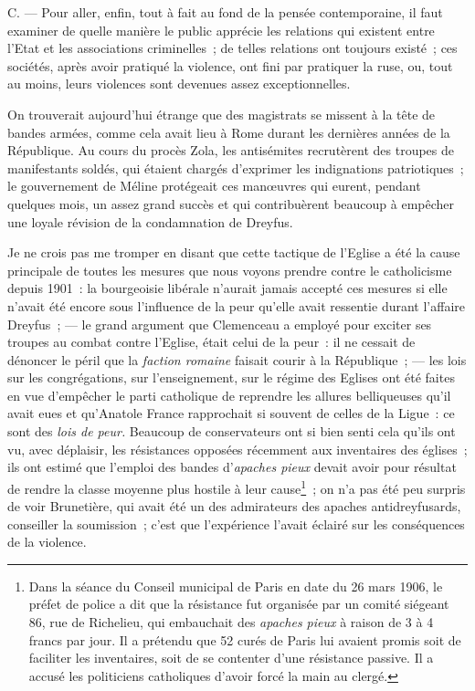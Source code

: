 \documentclass[french,twoside]{book} %
\begin{document}
\noindent C. — Pour aller, enfin, tout à fait au fond de la pensée contemporaine, il faut examiner de quelle manière le public apprécie les relations qui existent entre l’Etat et les associations criminelles ; de telles relations ont toujours existé ; ces sociétés, après avoir pratiqué la violence, ont fini par pratiquer la ruse, ou, tout au moins, leurs violences sont devenues assez exceptionnelles.\par
On trouverait aujourd’hui étrange que des magistrats se missent à la tête de bandes armées, comme cela avait lieu à Rome durant les dernières années de la République. Au cours du procès Zola, les antisémites recrutèrent des troupes de manifestants soldés, qui étaient chargés d’exprimer les indignations patriotiques ; le gouvernement de Méline protégeait ces manœuvres qui eurent, pendant quelques mois, un assez grand succès et qui contribuèrent beaucoup à empêcher une loyale révision de la condamnation de Dreyfus.\par
 Je ne crois pas me tromper en disant que cette tactique de l’Eglise a été la cause principale de toutes les mesures que nous voyons prendre contre le catholicisme depuis 1901 : la bourgeoisie libérale n’aurait jamais accepté ces mesures si elle n’avait été encore sous l’influence de la peur qu’elle avait ressentie durant l’affaire Dreyfus ; — le grand argument que Clemenceau a employé pour exciter ses troupes au combat contre l’Eglise, était celui de la peur : il ne cessait de dénoncer le péril que la \emph{faction romaine} faisait courir à la République ; — les lois sur les congrégations, sur l’enseignement, sur le régime des Eglises ont été faites en vue d’empêcher le parti catholique de reprendre les allures belliqueuses qu’il avait eues et qu’Anatole France rapprochait si souvent de celles de la Ligue : ce sont des \emph{lois de peur.} Beaucoup de conservateurs ont si bien senti cela qu’ils ont vu, avec déplaisir, les résistances opposées récemment aux inventaires des églises ; ils ont estimé que l’emploi des bandes d’\emph{apaches pieux} devait avoir pour résultat de rendre la classe moyenne plus hostile à leur cause\footnote{ \noindent Dans la séance du Conseil municipal de Paris en date du 26 mars 1906, le préfet de police a dit que la résistance fut organisée par un comité siégeant 86, rue de Richelieu, qui embauchait des \emph{apaches pieux} à raison de 3 à 4 francs par jour. Il a prétendu que 52 curés de Paris lui avaient promis soit de faciliter les inventaires, soit de se contenter d’une résistance passive. Il a accusé les politiciens catholiques d’avoir forcé la main au clergé.
 } ; on n’a pas été peu surpris de voir Brunetière, qui avait été un des admirateurs des apaches antidreyfusards, conseiller la soumission ;  c’est que l’expérience l’avait éclairé sur les conséquences de la violence.\par
\end{document}
